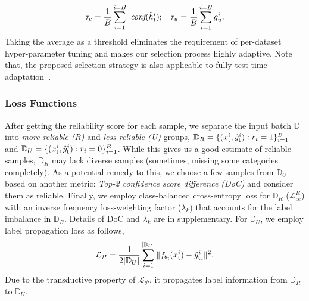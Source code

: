 \documentclass[10pt,twocolumn,letterpaper]{article}
\begin{document}
\begin{equation}
    \vspace{-1mm}
    \tau_c = \frac{1}{B}\sum_{i=1}^{i=B} \textit{  conf}(\Hat{h}_\mathsf{t}^i); \hspace{3mm} \tau_u = \frac{1}{B}\sum_{i=1}^{i=B} g_u^i.\label{eq:con_thr}
    \vspace{-1mm}
\end{equation}
Taking the average as a threshold eliminates the requirement of per-dataset hyper-parameter tuning and makes our selection process highly adaptive. Note that, the proposed selection strategy is also applicable to fully test-time adaptation~\cite{wang2021tent,chen2022contrastive}. 
\vspace{-2mm}
\subsubsection{Loss Functions}
\vspace{-1mm}
After getting the reliability score for each sample, we separate the input batch $\mathbb{D}$ into \emph{more reliable (R)} and \emph{less reliable (U)} groups, $\mathbb{D}_R=\{(x_\mathsf{t}^i,\Hat{y}_\mathsf{t}^i):r_i=1\}_{i=1}^{B}$ and $\mathbb{D}_U=\{(x_\mathsf{t}^i,\Hat{y}_\mathsf{t}^i):r_i=0\}_{i=1}^{B}$. While this gives us a good estimate of reliable samples, $\mathbb{D}_R$ may lack diverse samples (sometimes, missing some categories completely). As a potential remedy to this, we choose a few samples from $\mathbb{D}_U$ based on another metric: \emph{Top-2 confidence score difference (DoC)} and consider them as reliable. Finally, we employ class-balanced cross-entropy loss for $\mathbb{D}_R$ ($\mathcal{L}_{ce}^R$) with an inverse frequency loss-weighting factor ($\lambda_k$) that accounts for the label imbalance in $\mathbb{D}_R$. Details of DoC and $\lambda_k$ are in supplementary. For $\mathbb{D}_U$, we employ label propagation loss\cite{zhou2003learning} as follows,
\begin{equation}
   \vspace{-1mm}
    \mathcal{L}_\mathcal{P} = \frac{1}{2|\mathbb{D}_U|} \sum_{i=1}^{|\mathbb{D}_U|} \Vert f_{\theta_\mathsf{t}}(x_\mathsf{t}^i) - \Hat{y}_\mathsf{tc}^i \Vert^2 .\label{eq:label_prop} 
    \vspace{-0.5mm}
\end{equation}
Due to the transductive property of $\mathcal{L}_\mathcal{P}$, it propagates label information from $\mathbb{D}_R$ to $\mathbb{D}_U$. 
\end{document}
